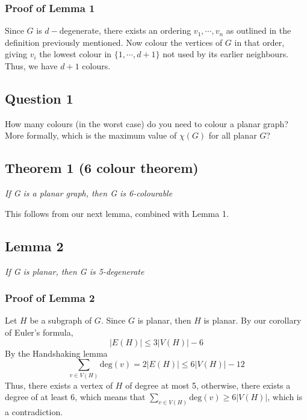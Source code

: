 \documentclass{report}
\begin{document}
\subsubsection{Proof of Lemma 1}
Since $G$ is $d-$degenerate, there exists an ordering $v_1, \cdots, v_n$ as outlined in the definition previously mentioned. Now colour the vertices of $G$ in that order, giving $v_i$ the lowest colour in $\{1, \cdots, d+1\}$ not used by its earlier neighbours. Thus, we have $d+1$ colours.
\subsection{Question 1}
\begin{center}
How many colours (in the worst case) do you need to colour a planar graph? More formally, which is the maximum value of $\chi(G)$ for all planar $G$?
\end{center}
\subsection{Theorem 1 (6 colour theorem)}
\begin{center}
\textit{If G is a planar graph, then G is 6-colourable}
\end{center}
This follows from our next lemma, combined with Lemma 1.
\subsection{Lemma 2}
\begin{center}
\textit{If G is planar, then G is 5-degenerate}
\end{center}
\subsubsection{Proof of Lemma 2}
Let $H$ be a subgraph of $G$. Since $G$ is planar, then $H$ is planar. By our corollary of Euler's formula, $$|E(H)| \leq 3|V(H)| - 6$$ By the Handshaking lemma $$\sum_{v\in V(H)} \mathrm{deg}(v) = 2|E(H)| \leq 6|V(H)| - 12$$
Thus, there exists a vertex of $H$ of degree at most 5, otherwise, there exists a degree of at least 6, which means that $\displaystyle \sum_{v \in V(H)} \mathrm{deg}(v) \geq 6|V(H)|$, which is a contradiction.
\end{document}
